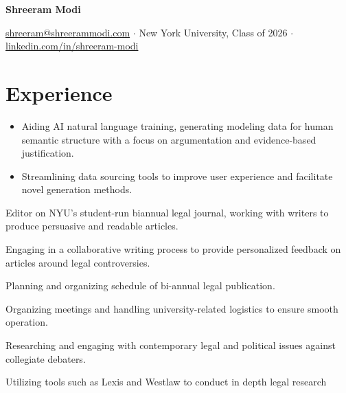 \documentclass[letterpaper]{resume-shreeram}
\begin{document}
\begin{center}
  {\Huge \bfseries Shreeram Modi}

  \href{mailto:shreeram@shreerammodi.com}{shreeram@shreerammodi.com}
  $\cdot$
  New York University, Class of 2026
  $\cdot$
  \href{https://linkedin.com/in/shreeram-modi}{linkedin.com/in/shreeram-modi}
\end{center}

\section{Experience}

\begin{itemize}
  \item
    Aiding AI natural language training, generating modeling data for human semantic structure with a focus on argumentation and evidence-based justification.

  \item
    Streamlining data sourcing tools to improve user experience and facilitate novel generation methods.
\end{itemize}

\begin{compactitem}
  \item
    Editor on NYU's student-run biannual legal journal, working with writers to produce persuasive and readable articles.

  \item
    Engaging in a collaborative writing process to provide personalized feedback on articles around legal controversies.
\end{compactitem}

\begin{compactitem}
  \item
    Planning and organizing schedule of bi-annual legal publication.

  \item
    Organizing meetings and handling university-related logistics to ensure smooth operation.
\end{compactitem}

\begin{compactitem}
  \item
    Researching and engaging with contemporary legal and political issues against collegiate debaters.

  \item
    Utilizing tools such as Lexis and Westlaw to conduct in depth legal research
\end{compactitem}
\end{document}
